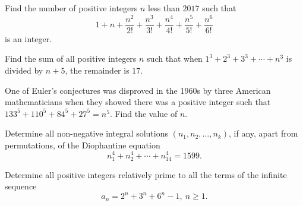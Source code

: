 \documentclass[mast]{lucky}
\begin{document}
\begin{prob}[AIME II 2017/8]{6}
Find the number of positive integers $n$ less than $2017$ such that
\[ 1+n+\frac{n^2}{2!}+\frac{n^3}{3!}+\frac{n^4}{4!}+\frac{n^5}{5!}+\frac{n^6}{6!} \]is an integer.
\end{prob}

\begin{prob}[AOIME 2020/10]{6}
Find the sum of all positive integers $n$ such that when $1^3+2^3+3^3+\cdots+n^3$ is divided by $n+5$, the remainder is $17.$
\end{prob}

\begin{req}[AIME 1989/9]{9}
One of Euler's conjectures was disproved in the 1960s by three American mathematicians when they showed there was a positive integer such that $133^5+110^5+84^5+27^5=n^{5}$. Find the value of $n$.
\end{req}
    
\begin{prob}[USAMO 1979/1]{9}
Determine all non-negative integral solutions $(n_1, n_2, \dots , n_k)$, if any, apart from permutations, of the Diophantine equation
$$n_1^4 + n_2^4 + \cdots + n_{14}^{4} = 1599.$$
\end{prob}

\begin{prob}[IMO 2005/4]{13}
Determine all positive integers relatively prime to all the terms of the infinite sequence
\[a_n=2^n+3^n+6^n -1,\ n\geq 1.\]
\end{prob}
\end{document}
